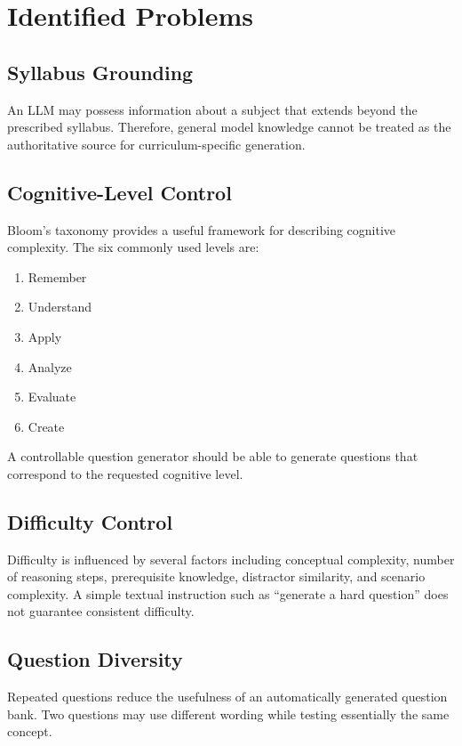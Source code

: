 \documentclass[12pt,a4paper]{report}
\begin{document}
\section{Identified Problems}

\subsection{Syllabus Grounding}

An LLM may possess information about a subject that extends beyond the prescribed syllabus. Therefore, general model knowledge cannot be treated as the authoritative source for curriculum-specific generation.

\subsection{Cognitive-Level Control}

Bloom's taxonomy provides a useful framework for describing cognitive complexity. The six commonly used levels are:

\begin{enumerate}
    \item Remember
    \item Understand
    \item Apply
    \item Analyze
    \item Evaluate
    \item Create
\end{enumerate}

A controllable question generator should be able to generate questions that correspond to the requested cognitive level.

\subsection{Difficulty Control}

Difficulty is influenced by several factors including conceptual complexity, number of reasoning steps, prerequisite knowledge, distractor similarity, and scenario complexity. A simple textual instruction such as ``generate a hard question'' does not guarantee consistent difficulty.

\subsection{Question Diversity}

Repeated questions reduce the usefulness of an automatically generated question bank. Two questions may use different wording while testing essentially the same concept.
\end{document}
